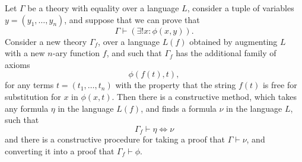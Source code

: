 \begin{theorem}
    Let $\Gamma$ be a theory with equality over a language $L$, consider a tuple of variables $y = (y_1,\dots,y_n)$, and suppose that we can prove that
    \[ \Gamma \vdash (\exists ! x: \phi(x,y)). \]
    Consider a new theory $\Gamma_f$, over a language $L(f)$ obtained by augmenting $L$ with a new $n$-ary function $f$, and such that $\Gamma_f$ has the additional family of axioms
    \[ \phi(f(t), t), \]
    for any terms $t = (t_1,\dots,t_n)$ with the property that the string $f(t)$ is free for substitution for $x$ in $\phi(x,t)$. Then there is a constructive method, which takes any formula $\eta$ in the language $L(f)$, and finds a formula $\nu$ in the language $L$, such that
    \[ \Gamma_f \vdash \eta \Leftrightarrow \nu \]
    and there is a constructive procedure for taking a proof that $\Gamma \vdash \nu$, and converting it into a proof that $\Gamma_f \vdash \phi$.
\end{theorem}
